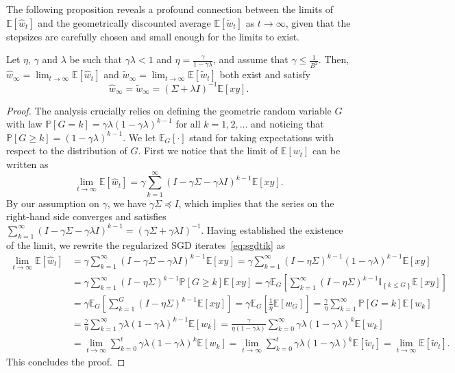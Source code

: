 \documentclass[final,12pt]{colt2018} %
\newcommand{\II}[1]{\mathbb{I}_{\left\{#1\right\}}}
\newcommand{\PP}[1]{\mathbb{P}\left[#1\right]}
\newcommand{\EE}[1]{\mathbb{E}\left[#1\right]}
\newcommand{\EEG}[1]{\mathbb{E}_G\left[#1\right]}
\newcommand{\ra}{\rightarrow}
\newcommand{\pa}[1]{\left(#1\right)}
\newcommand{\wh}{\widehat}
\newcommand{\wt}{\widetilde}
\newcommand{\tw}{\wt{w}}
\newcommand{\hw}{\wh{w}}
\begin{document}
The following proposition reveals a profound connection between the limits of $\EE{\hw_t}$ and the geometrically discounted average 
$\EE{\tw_t}$ as $t\ra \infty$, given that the stepsizes are carefully chosen and small enough for the limits to exist. 
\begin{proposition}\label{prop:limit_eq}
 Let $\eta$, $\gamma$ and $\lambda$ be such that $\gamma \lambda < 1$ and $\eta = \frac{\gamma}{1-\gamma\lambda}$, and assume that $\gamma 
\le \frac{1}{B^2}$. Then, $\hw_\infty = \lim_{t\ra\infty} \EE{\hw_t}$ and $\tw_\infty = \lim_{t\ra\infty} \EE{\tw_t}$ both exist 
and satisfy
 \[\hw_\infty = \tw_\infty = \pa{\Sigma + \lambda I}^{-1}\EE{xy}.\]
\end{proposition}
\begin{proof}
The analysis crucially relies on defining the geometric random variable $G$ with law $\PP{G=k} = \gamma \lambda \pa{1-\gamma 
\lambda}^{k-1}$ 
for 
all $k=1,2,\dots$ and noticing that $\PP{G\ge k} = \pa{1-\gamma\lambda}^{k-1}$. We let $\EEG{\cdot}$ stand for taking expectations with 
respect to the distribution of $G$. 
 First we notice that the limit of $\EE{w_t}$ can be written as
 \[
  \lim_{t\ra\infty} \EE{\hw_t} = \gamma \sum_{k=1}^\infty \pa{I - \gamma \Sigma - \gamma \lambda I}^{k-1} \EE{xy}.
 \]
 By our assumption on $\gamma$, we have $\gamma \Sigma \preccurlyeq I$, which implies that the series on the right-hand side converges 
and satisfies $\sum_{k=1}^\infty \pa{I - \gamma \Sigma - \gamma \lambda I}^{k-1} = \pa{\gamma \Sigma + \gamma \lambda I}^{-1}$. Having 
established the existence of the limit, we rewrite the regularized SGD iterates~\eqref{eq:sgdtik} as
\begin{align*}
  \lim_{t\ra\infty} \EE{\hw_t} &= \gamma \sum_{k=1}^\infty \pa{I - \gamma \Sigma - \gamma \lambda I}^{k-1} \EE{xy}
  = \gamma \sum_{k=1}^\infty \pa{I - \eta \Sigma}^{k-1} (1-\gamma\lambda)^{k-1} \EE{xy}
  \\
  &= \gamma \sum_{k=1}^\infty \pa{I - \eta \Sigma}^{k-1} \PP{G\ge k} \EE{xy} 
  = \gamma \EEG{\sum_{k=1}^\infty \pa{I - \eta \Sigma}^{k-1} \II{k\le G} \EE{xy}}
  \\
  &= \gamma \EEG{\sum_{k=1}^G \pa{I - \eta \Sigma}^{k-1}  \EE{xy}} = \gamma  \EEG{\frac 1\eta \EE{w_G}} = \frac{\gamma}{\eta} 
\sum_{k=1}^\infty \PP{G = k} \EE{w_k} 
  \\
  &= \frac{\gamma}{\eta} \sum_{k=1}^\infty \gamma \lambda (1-\gamma 
\lambda)^{k-1} \EE{w_k}
 = 
\frac{\gamma}{\eta(1-\gamma \lambda)} \sum_{k=0}^\infty \gamma \lambda (1-\gamma 
\lambda)^{k} \EE{w_k} 
\\
&= \lim_{t\ra\infty} \sum_{k=0}^t \gamma \lambda (1-\gamma \lambda)^{k} \EE{w_k} =
\lim_{t\ra\infty} \sum_{k=0}^t \gamma \lambda (1-\gamma \lambda)^{k} \EE{\tw_t}
  = \lim_{t\ra\infty} \EE{\tw_t}.
\end{align*}
This concludes the proof.
\end{proof}
\end{document}
